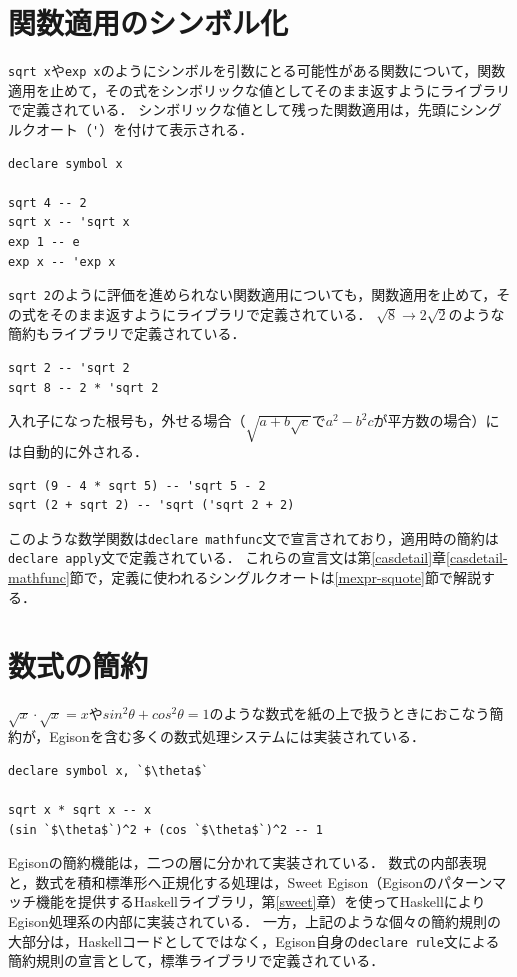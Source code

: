 \section{関数適用のシンボル化}\label{cas-symbol2}

\lstinline{sqrt x}や\lstinline{exp x}のようにシンボルを引数にとる可能性がある関数について，関数適用を止めて，その式をシンボリックな値としてそのまま返すようにライブラリで定義されている．
シンボリックな値として残った関数適用は，先頭にシングルクオート（\lstinline{'}）を付けて表示される．
\begin{lstlisting}[language=egison,numbers=none]
declare symbol x

sqrt 4 -- 2
sqrt x -- 'sqrt x
exp 1 -- e
exp x -- 'exp x
\end{lstlisting}

\lstinline{sqrt 2}のように評価を進められない関数適用についても，関数適用を止めて，その式をそのまま返すようにライブラリで定義されている．
$\sqrt{8} \rightarrow 2 \sqrt{2}$のような簡約もライブラリで定義されている．
\begin{lstlisting}[language=egison,numbers=none]
sqrt 2 -- 'sqrt 2
sqrt 8 -- 2 * 'sqrt 2
\end{lstlisting}
入れ子になった根号も，外せる場合（$\sqrt{a+b\sqrt{c}}$で$a^2-b^2c$が平方数の場合）には自動的に外される．
\begin{lstlisting}[language=egison,numbers=none]
sqrt (9 - 4 * sqrt 5) -- 'sqrt 5 - 2
sqrt (2 + sqrt 2) -- 'sqrt ('sqrt 2 + 2)
\end{lstlisting}
このような数学関数は\lstinline{declare mathfunc}文で宣言されており，適用時の簡約は\lstinline{declare apply}文で定義されている．
これらの宣言文は第\ref{casdetail}章\ref{casdetail-mathfunc}節で，定義に使われるシングルクオートは\ref{mexpr-squote}節で解説する．


\section{数式の簡約}\label{cas-simplify}

$\sqrt{x} \cdot \sqrt{x} = x$や$sin^2\theta + cos^2\theta = 1$のような数式を紙の上で扱うときにおこなう簡約が，Egisonを含む多くの数式処理システムには実装されている．
\begin{lstlisting}[language=egison,numbers=none]
declare symbol x, `$\theta$`

sqrt x * sqrt x -- x
(sin `$\theta$`)^2 + (cos `$\theta$`)^2 -- 1
\end{lstlisting}
Egisonの簡約機能は，二つの層に分かれて実装されている．
数式の内部表現と，数式を積和標準形へ正規化する処理は，Sweet Egison（Egisonのパターンマッチ機能を提供するHaskellライブラリ，第\ref{sweet}章）を使ってHaskellによりEgison処理系の内部に実装されている．
一方，上記のような個々の簡約規則の大部分は，Haskellコードとしてではなく，Egison自身の\lstinline{declare rule}文による簡約規則の宣言として，標準ライブラリで定義されている．

